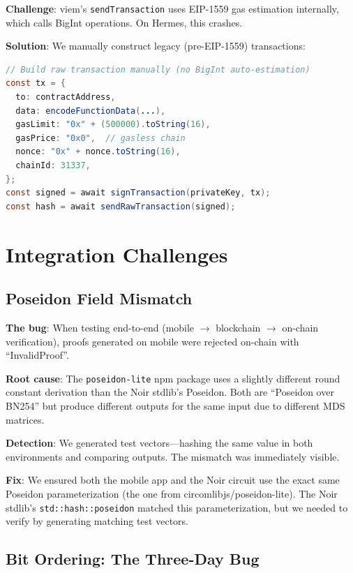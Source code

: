 \textbf{Challenge}: viem's \texttt{sendTransaction} uses EIP-1559 gas estimation internally, which calls BigInt operations. On Hermes, this crashes.

\textbf{Solution}: We manually construct legacy (pre-EIP-1559) transactions:
\begin{lstlisting}[language=Java, caption={Manual legacy transaction construction for Hermes compatibility.}]
// Build raw transaction manually (no BigInt auto-estimation)
const tx = {
  to: contractAddress,
  data: encodeFunctionData(...),
  gasLimit: "0x" + (500000).toString(16),
  gasPrice: "0x0",  // gasless chain
  nonce: "0x" + nonce.toString(16),
  chainId: 31337,
};
const signed = await signTransaction(privateKey, tx);
const hash = await sendRawTransaction(signed);
\end{lstlisting}

\section{Integration Challenges}

\subsection{Poseidon Field Mismatch}

\textbf{The bug}: When testing end-to-end (mobile $\to$ blockchain $\to$ on-chain verification), proofs generated on mobile were rejected on-chain with ``InvalidProof''.

\textbf{Root cause}: The \texttt{poseidon-lite} npm package uses a slightly different round constant derivation than the Noir stdlib's Poseidon. Both are ``Poseidon over BN254'' but produce different outputs for the same input due to different MDS matrices.

\textbf{Detection}: We generated test vectors---hashing the same value in both environments and comparing outputs. The mismatch was immediately visible.

\textbf{Fix}: We ensured both the mobile app and the Noir circuit use the exact same Poseidon parameterization (the one from circomlibjs/poseidon-lite). The Noir stdlib's \texttt{std::hash::poseidon} matched this parameterization, but we needed to verify by generating matching test vectors.

\subsection{Bit Ordering: The Three-Day Bug}

